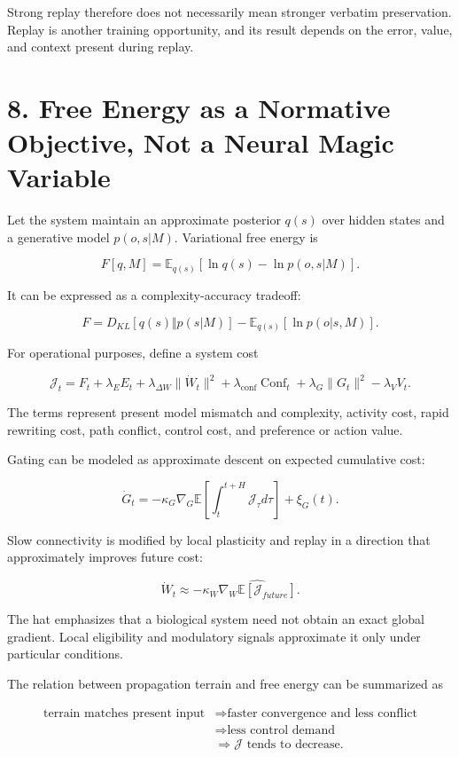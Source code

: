 \documentclass[11pt, a4paper]{article}
\begin{document}
Strong replay therefore does not necessarily mean stronger verbatim preservation. Replay is another training opportunity, and its result depends on the error, value, and context present during replay.


\section{8. Free Energy as a Normative Objective, Not a Neural Magic Variable}

Let the system maintain an approximate posterior $q(s)$ over hidden states and a generative model $p(o,s|M)$. Variational free energy is

\[
F[q,M]=\mathbb{E}_{q(s)}[\ln q(s)-\ln p(o,s|M)].
\]

It can be expressed as a complexity-accuracy tradeoff:

\[
F=D_{KL}[q(s)\Vert p(s|M)]-\mathbb{E}_{q(s)}[\ln p(o|s,M)].
\]

For operational purposes, define a system cost

\[
\mathcal{J}_t
=F_t+\lambda_EE_t+\lambda_{\Delta W}\|\dot W_t\|^2
+\lambda_{\mathrm{conf}}\operatorname{Conf}_t+\lambda_G\|G_t\|^2-\lambda_VV_t.
\]

The terms represent present model mismatch and complexity, activity cost, rapid rewriting cost, path conflict, control cost, and preference or action value.

Gating can be modeled as approximate descent on expected cumulative cost:

\[
\dot G_t=-\kappa_G\nabla_G\mathbb{E}\left[\int_t^{t+H}\mathcal{J}_\tau d\tau\right]+\xi_G(t).
\]

Slow connectivity is modified by local plasticity and replay in a direction that approximately improves future cost:

\[
\dot W_t\approx-\kappa_W\widehat{\nabla_W\mathbb{E}[\mathcal{J}_{future}]}.
\]

The hat emphasizes that a biological system need not obtain an exact global gradient. Local eligibility and modulatory signals approximate it only under particular conditions.

The relation between propagation terrain and free energy can be summarized as

\[
\begin{aligned}
\text{terrain matches present input}
&\Rightarrow \text{faster convergence and less conflict}\\
&\Rightarrow \text{less control demand}\\
&\Rightarrow \mathcal{J}\text{ tends to decrease}.
\end{aligned}
\]
\end{document}
